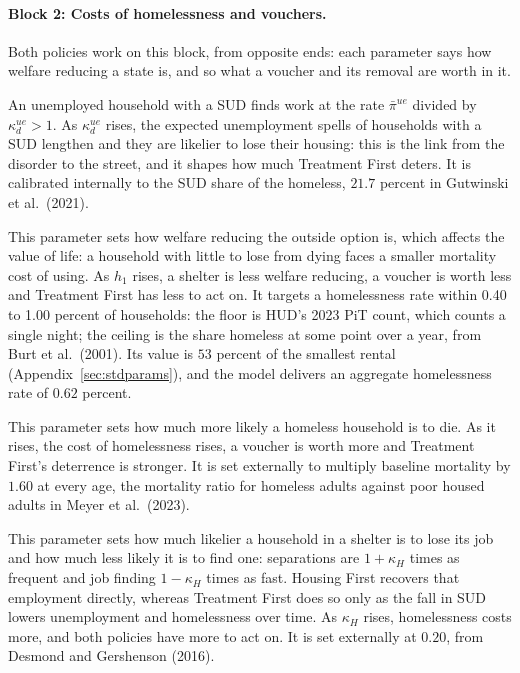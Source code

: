 \documentclass[10pt]{article}
\begin{document}
\paragraph{Block 2: Costs of homelessness and vouchers.} Both policies work on this block, from opposite ends: each parameter says how welfare reducing a state is, and so what a voucher and its removal are worth in it.
\begin{description}\setlength{\itemsep}{0.25em}\setlength{\parskip}{0em}
\item[$\kappa^{ue}_{d}$, how much less likely it is to regain employment with a SUD.] An unemployed household with a SUD finds work at the rate $\bar\pi^{ue}$ divided by $\kappa^{ue}_{d}{}>1$. As $\kappa^{ue}_{d}$ rises, the expected unemployment spells of households with a SUD lengthen and they are likelier to lose their housing: this is the link from the disorder to the street, and it shapes how much Treatment First deters. It is calibrated internally to the SUD share of the homeless, $21.7$ percent in Gutwinski et al.\ (2021).
\item[$h_1$, the service flow of homelessness.] This parameter sets how welfare reducing the outside option is, which affects the value of life: a household with little to lose from dying faces a smaller mortality cost of using. As $h_1$ rises, a shelter is less welfare reducing, a voucher is worth less and Treatment First has less to act on. It targets a homelessness rate within 0.40 to 1.00 percent of households: the floor is HUD's 2023 PiT count, which counts a single night; the ceiling is the share homeless at some point over a year, from Burt et al.\ (2001). Its value is $53$ percent of the smallest rental (Appendix~\ref{sec:stdparams}), and the model delivers an aggregate homelessness rate of $0.62$ percent.
\item[$\kappa_{\phi H}$, mortality when homeless.] This parameter sets how much more likely a homeless household is to die. As it rises, the cost of homelessness rises, a voucher is worth more and Treatment First's deterrence is stronger. It is set externally to multiply baseline mortality by $1.60$ at every age, the mortality ratio for homeless adults against poor housed adults in Meyer et al.\ (2023).
\item[$\kappa_{H}$, the employment penalty of homelessness.] This parameter sets how much likelier a household in a shelter is to lose its job and how much less likely it is to find one: separations are $1+\kappa_H$ times as frequent and job finding $1-\kappa_H$ times as fast. Housing First recovers that employment directly, whereas Treatment First does so only as the fall in SUD lowers unemployment and homelessness over time. As $\kappa_H$ rises, homelessness costs more, and both policies have more to act on. It is set externally at $0.20$, from Desmond and Gershenson (2016).

\end{description}
\end{document}

